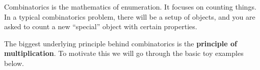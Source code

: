 Combinatorics is the mathematics of enumeration. It focuses on counting things. In a typical combinatorics problem, there will be a setup of objects, and you are asked to count a new ``special'' object with certain properties.

The biggest underlying principle behind combinatorics is the \textbf{principle of multiplication}. To motivate this we will go through the basic toy examples below.
